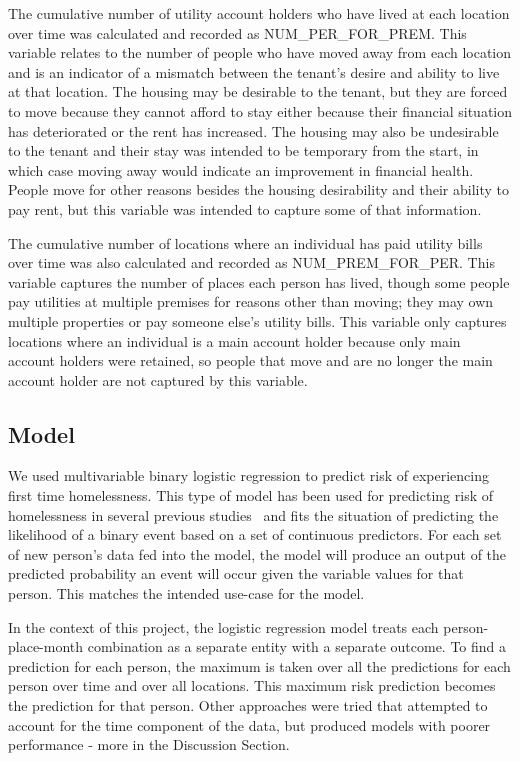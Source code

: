 \documentclass[10pt,letterpaper]{article}
\begin{document}
The cumulative number of utility account holders who have lived at each location over time was calculated and recorded as NUM\_PER\_FOR\_PREM. This variable relates to the number of people who have moved away from each location and is an indicator of a mismatch between the tenant's desire and ability to live at that location. The housing may be desirable to the tenant, but they are forced to move because they cannot afford to stay either because their financial situation has deteriorated or the rent has increased. The housing may also be undesirable to the tenant and their stay was intended to be temporary from the start, in which case moving away would indicate an improvement in financial health. People move for other reasons besides the housing desirability and their ability to pay rent, but this variable was intended to capture some of that information.

The cumulative number of locations where an individual has paid utility bills over time was also calculated and recorded as NUM\_PREM\_FOR\_PER. This variable captures the number of places each person has lived, though some people pay utilities at multiple premises for reasons other than moving; they may own multiple properties or pay someone else's utility bills. This variable only captures locations where an individual is a main account holder because only main account holders were retained, so people that move and are no longer the main account holder are not captured by this variable.

\subsection*{Model}
We used multivariable binary logistic regression to predict risk of experiencing first time homelessness. This type of model has been used for predicting risk of homelessness in several previous studies~\cite{byrne2020classification,van2009longitudinal,flaming2011crisis, hong2018applications,toros2019early} and fits the situation of predicting the likelihood of a binary event based on a set of continuous predictors. For each set of new person's data fed into the model, the model will produce an output of the predicted probability an event will occur given the variable values for that person. This matches the intended use-case for the model. 

In the context of this project, the logistic regression model treats each person-place-month combination as a separate entity with a separate outcome. To find a prediction for each person, the maximum is taken over all the predictions for each person over time and over all locations. This maximum risk prediction becomes the prediction for that person. Other approaches were tried that attempted to account for the time component of the data, but produced models with poorer performance - more in the Discussion Section.
\end{document}
